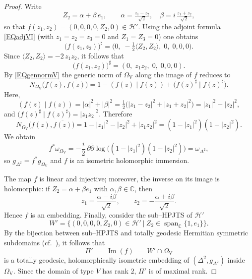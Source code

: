 \documentclass[reqno, 11pt]{amsart}
\newcommand{\Span}{\operatorname {span}}
\begin{document}
\begin{proof}
Write
\[
Z_{2}=\alpha+\beta\,e_{1},
\qquad
\alpha=\tfrac{z_{1}-z_{2}}{\sqrt{2}},\quad
\beta=i\,\tfrac{z_{1}+z_{2}}{\sqrt{2}},
\]
so that \(f(z_{1},z_{2})=(0,0,0,0,Z_{2},0)\in\mathcal H'\).
Using the adjoint formula \eqref{EQadjVI} (with \(z_{1}=z_{2}=z_{3}=0\) and \(Z_{1}=Z_{3}=0\)) one obtains
\[
\bigl(f(z_{1},z_{2})\bigr)^{\sharp}
=\bigl(0,\;-\tfrac12\langle Z_{2},Z_{2}\rangle,\;0,\;0,0,0\bigr).
\]
Since \(\langle Z_{2},Z_{2}\rangle=-2\,z_{1}z_{2}\),
it follows that
\[
\bigl(f(z_{1},z_{2})\bigr)^{\sharp}=(0,\;z_{1}z_{2},\;0,\;0,0,0).
\]
By \eqref{EQgennormV}  the generic norm of \(\Omega_{\mathrm V}\) along the image of \(f\) reduces to
\[
N_{\Omega_{\mathrm V}}\bigl(f(z),\overline{f(z)}\bigr)
=1-(f(z)\mid f(z))+\bigl(f(z)^{\sharp}\mid f(z)^{\sharp}\bigr).
\]
Here,
\[
(f(z)\mid f(z))=|\alpha|^{2}+|\beta|^{2}
=\tfrac12\bigl(|z_{1}-z_{2}|^{2}+|z_{1}+z_{2}|^{2}\bigr)=|z_{1}|^{2}+|z_{2}|^{2},
\]
and \(\bigl(f(z)^{\sharp}\mid f(z)^{\sharp}\bigr)=|z_{1}z_{2}|^{2}\).
Therefore
\begin{equation}\label{eq:gennormV}
N_{\Omega_{\mathrm V}}\bigl(f(z),\overline{f(z)}\bigr)
=1-|z_{1}|^{2}-|z_{2}|^{2}+|z_{1}z_{2}|^{2}
=(1-|z_{1}|^{2})(1-|z_{2}|^{2}).
\end{equation}
We obtain
\[
f^{*}\omega_{\Omega_{\mathrm V}}
=-\frac{i}{2}\,\partial\bar\partial
\log\bigl((1-|z_{1}|^{2})(1-|z_{2}|^{2})\bigr)
=\omega_{\Delta^{2}},
\]
so \(g_{\Delta^{2}}=f^{*}g_{\Omega_{\mathrm V}}\) and \(f\) is an isometric holomorphic immersion.

The map \(f\) is linear and injective; moreover, the inverse on its image is holomorphic:
if \(Z_{2}=\alpha+\beta e_{1}\) with \(\alpha,\beta\in\mathbb C\), then
\[
z_{1}=\frac{\alpha-i\beta}{\sqrt{2}},
\qquad
z_{2}=-\frac{\alpha+i\beta}{\sqrt{2}}.
\]
Hence \(f\) is an embedding.
Finally, consider the sub–HPJTS of \(\mathcal{H}'\)
\[
W'=\bigl\{(0,0,0,0,Z_{2},0)\in\mathcal H'\ \big|\ Z_{2}\in\Span_{\mathbb C}\{1,e_{1}\}\bigr\}.
\]
By the bijection between sub–HPJTS and totally geodesic Hermitian symmetric subdomains (cf.\ \cite[Proposition 2.1]{DISCALALOI2008sympdual}), it follows that
\[
\Pi' \;=\;\operatorname{Im}(f)
\;=\;W'\cap\Omega_{\mathrm{V}}
\]
is a totally geodesic, holomorphically isometric embedding of \((\Delta^{2},g_{\Delta^{2}})\) inside \(\Omega_{\mathrm{V}}\).  Since the domain of type \(V\) has rank \(2\), \(\Pi'\) is of maximal rank.
\end{proof}


\end{document}
